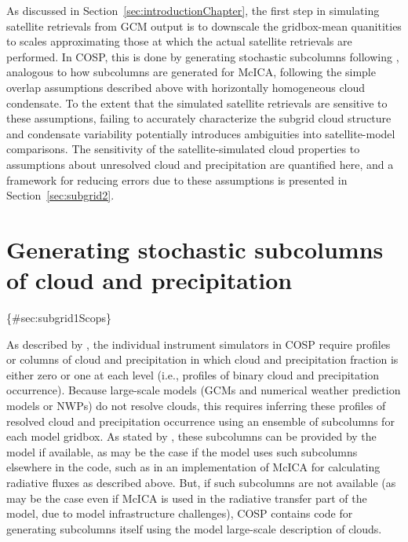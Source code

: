 As discussed in Section~\ref{sec:introductionChapter}, the first step in
simulating satellite retrievals from GCM output is to downscale the
gridbox-mean quanitities to scales approximating those at which the
actual satellite retrievals are performed. In COSP, this is done by
generating stochastic subcolumns following \citet{klein_and_jakob_1999},
analogous to how subcolumns are generated for McICA, following the
simple overlap assumptions described above with horizontally homogeneous
cloud condensate. To the extent that the simulated satellite retrievals
are sensitive to these assumptions, failing to accurately characterize
the subgrid cloud structure and condensate variability potentially
introduces ambiguities into satellite-model comparisons. The sensitivity
of the satellite-simulated cloud properties to assumptions about
unresolved cloud and precipitation are quantified here, and a framework
for reducing errors due to these assumptions is presented in
Section~\ref{sec:subgrid2}.

\section{Generating stochastic subcolumns of cloud and
precipitation}\label{generating-stochastic-subcolumns-of-cloud-and-precipitation}

\{\#sec:subgrid1Scops\}

As described by \citet{bodas-salcedo_et_al_2011}, the individual
instrument simulators in COSP require profiles or columns of cloud and
precipitation in which cloud and precipitation fraction is either zero
or one at each level (i.e., profiles of binary cloud and precipitation
occurrence). Because large-scale models (GCMs and numerical weather
prediction models or NWPs) do not resolve clouds, this requires
inferring these profiles of resolved cloud and precipitation occurrence
using an ensemble of subcolumns for each model gridbox. As stated by
\citet{bodas-salcedo_et_al_2011}, these subcolumns can be provided by
the model if available, as may be the case if the model uses such
subcolumns elsewhere in the code, such as in an implementation of McICA
for calculating radiative fluxes as described above. But, if such
subcolumns are not available (as may be the case even if McICA is used
in the radiative transfer part of the model, due to model infrastructure
challenges), COSP contains code for generating subcolumns itself using
the model large-scale description of clouds.

